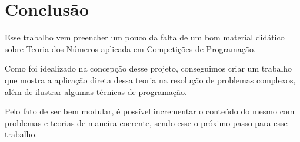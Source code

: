 
\chapter{Conclusão} %

\label{Chapter5} %


Esse trabalho vem preencher um pouco da falta de um bom material didático sobre Teoria dos Números aplicada em Competições de Programação.

Como foi idealizado na concepção desse projeto, conseguimos criar um trabalho que mostra a aplicação direta dessa teoria na resolução de problemas complexos,
além de ilustrar algumas técnicas de programação.

Pelo fato de ser bem modular, é possível incrementar o conteúdo do mesmo com problemas e teorias de maneira coerente, sendo esse o próximo passo para esse trabalho.
